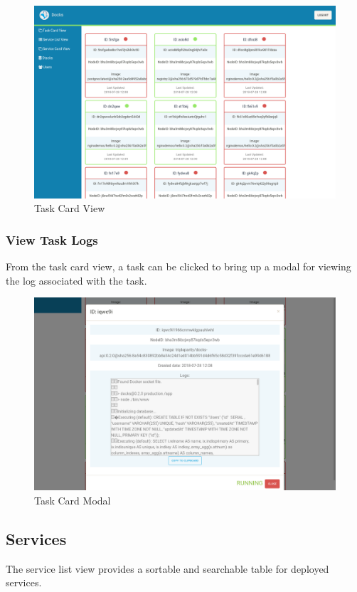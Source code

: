 \documentclass[]{article}
\begin{document}
\begin{figure}[H]
	\centering
	\includegraphics[scale=0.4]{task_card_view.png}
	\caption{Task Card View}
\end{figure}

\subsubsection{View Task Logs}
From the task card view, a task can be clicked to bring up a modal for viewing
the log associated with the task.

\begin{figure}[H]
	\centering
	\includegraphics[scale=0.4]{task_card_modal.png}
	\caption{Task Card Modal}
\end{figure}

\subsection{Services}
The service list view provides a sortable and searchable table for deployed services.
\end{document}
